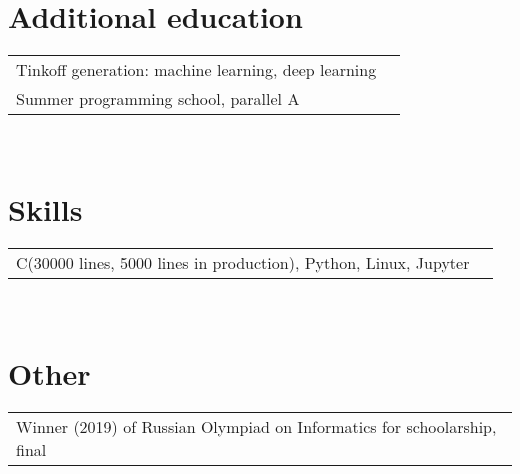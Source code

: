 \documentclass[a4paper,11pt]{article}
\newcommand{\CC}{C\nolinebreak\hspace{-.05em}\raisebox{.4ex}{\tiny\bf +}\nolinebreak\hspace{-.10em}\raisebox{.4ex}{\tiny\bf +}}
\begin{document}
\section{Additional education}

\vspace{5px}
\begin{tabular}{lr}
Tinkoff generation: machine learning, deep learning\\
Summer programming school, parallel A
\end{tabular}
\\

\section{Skills}

\vspace{5px}
\begin{tabular}{lr}
\CC(30000 lines, 5000 lines in production), Python, Linux, Jupyter\\
\end{tabular}
\\
\section{Other}

\vspace{5px}
\begin{tabular}{l}
Winner (2019) of Russian Olympiad on Informatics for schoolarship, final
\end{tabular}
\end{document}
